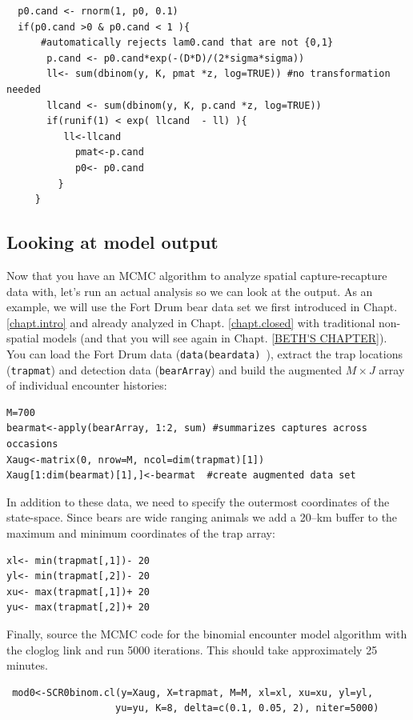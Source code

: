 \begin{verbatim}
  p0.cand <- rnorm(1, p0, 0.1)
  if(p0.cand >0 & p0.cand < 1 ){   
      #automatically rejects lam0.cand that are not {0,1}
       p.cand <- p0.cand*exp(-(D*D)/(2*sigma*sigma))
       ll<- sum(dbinom(y, K, pmat *z, log=TRUE)) #no transformation needed
       llcand <- sum(dbinom(y, K, p.cand *z, log=TRUE))
       if(runif(1) < exp( llcand  - ll) ){
          ll<-llcand
            pmat<-p.cand
            p0<- p0.cand
         }
     }
\end{verbatim}


\subsection{Looking at model output}
Now that you have an MCMC algorithm to analyze spatial capture-recapture 
data with, let's run an actual analysis so we can look at the output. As 
an example, we will use the Fort Drum 
bear data set we first introduced in Chapt. \ref{chapt.intro} and already analyzed in Chapt. \ref{chapt.closed} with 
traditional non-spatial models (and that you will see again in Chapt. 
\ref{BETH'S CHAPTER}). You can load the Fort Drum data
(\mbox{\tt data(beardata) }), extract the 
trap locations (\mbox{\tt trapmat}) and 
detection data (\mbox{\tt bearArray}) and build the augmented $M \times J$ array of individual 
encounter histories:
\begin{verbatim}
M=700
bearmat<-apply(bearArray, 1:2, sum) #summarizes captures across occasions
Xaug<-matrix(0, nrow=M, ncol=dim(trapmat)[1])
Xaug[1:dim(bearmat)[1],]<-bearmat  #create augmented data set
\end{verbatim}

 In addition to these data, we need to specify 
the outermost coordinates of the state-space. Since bears are wide 
ranging animals we add a 20--km buffer to the maximum and minimum 
coordinates of the trap array:

\begin{verbatim}
xl<- min(trapmat[,1])- 20  
yl<- min(trapmat[,2])- 20 
xu<- max(trapmat[,1])+ 20
yu<- max(trapmat[,2])+ 20
\end{verbatim}

Finally, source the MCMC code for the binomial encounter model algorithm 
with the cloglog link and run 5000 iterations. This should take 
approximately 25 minutes.
\begin{verbatim}
 mod0<-SCR0binom.cl(y=Xaug, X=trapmat, M=M, xl=xl, xu=xu, yl=yl, 
                   yu=yu, K=8, delta=c(0.1, 0.05, 2), niter=5000)
\end{verbatim}


